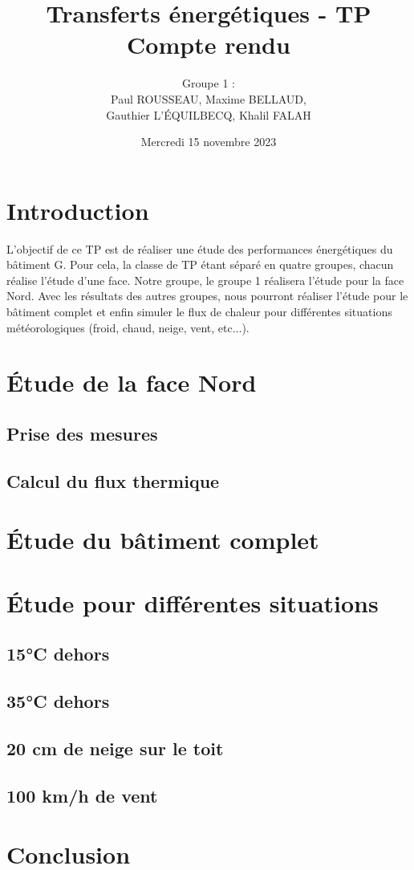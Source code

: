 \documentclass[12pt, a4paper]{article}
\title{Transferts énergétiques - TP \\
Compte rendu}
\author{Groupe 1 : \\
Paul ROUSSEAU, Maxime BELLAUD, \\
Gauthier L'ÉQUILBECQ, Khalil FALAH}
\date{Mercredi 15 novembre 2023}
\begin{document}
\maketitle

\tableofcontents

\section{Introduction}

L'objectif de ce TP est de réaliser une étude des performances énergétiques du bâtiment G. Pour cela, la classe de TP étant séparé en quatre groupes, chacun réalise l'étude d'une face. Notre groupe, le groupe 1 réalisera l'étude pour la face Nord. Avec les résultats des autres groupes, nous pourront réaliser l'étude pour le bâtiment complet et enfin simuler le flux de chaleur pour différentes situations météorologiques (froid, chaud, neige, vent, etc...).

\section{Étude de la face Nord}

\subsection{Prise des mesures}

\subsection{Calcul du flux thermique}

\section{Étude du bâtiment complet}

\section{Étude pour différentes situations}
\subsection{15°C dehors}

\subsection{35°C dehors}

\subsection{20 cm de neige sur le toit}

\subsection{100 km/h de vent}

\section{Conclusion}
\end{document}
